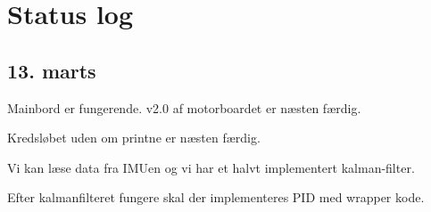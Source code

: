 \documentclass[a4paper,oneside,article,danish,table,draft]{memoir}
\begin{document}
\chapter{Status log}

\section{13. marts}
Mainbord er fungerende. v2.0 af motorboardet er næsten færdig.

Kredsløbet uden om printne er næsten færdig.

Vi kan læse data fra IMUen og vi har et halvt implementert kalman-filter.

Efter kalmanfilteret fungere skal der implementeres PID med wrapper kode.
\end{document}
